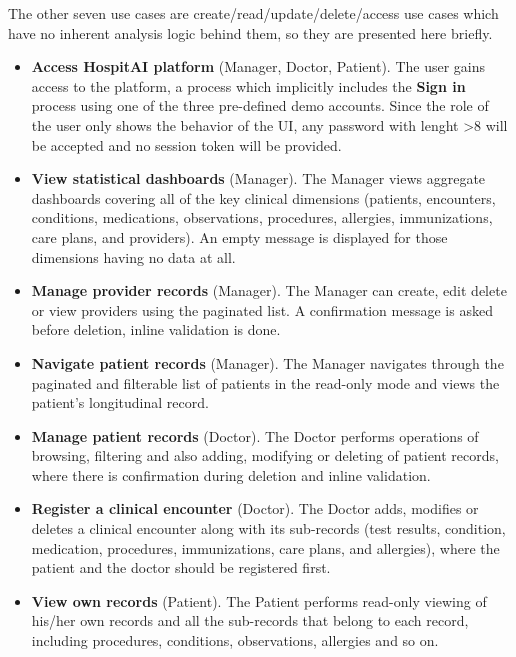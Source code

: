 \vspace{1cm}

The other seven use cases are create/read/update/delete/access use cases which have no inherent analysis logic behind them, so they are presented here briefly.

\begin{itemize}
    \item \textbf{Access HospitAI platform} (Manager, Doctor, Patient). The user gains access to the platform, a process which implicitly includes the \textbf{Sign in} process using one of the three pre-defined demo accounts. Since the role of the user only shows the behavior of the UI, any password with lenght >8 will be accepted and no session token will be provided.
    \item \textbf{View statistical dashboards} (Manager). The Manager views aggregate dashboards covering all of the key clinical dimensions (patients, encounters, conditions, medications, observations, procedures, allergies, immunizations, care plans, and providers). An empty message is displayed for those dimensions having no data at all.
    \item \textbf{Manage provider records} (Manager). The Manager can create, edit delete or view providers using the paginated list. A confirmation message is asked before deletion, inline validation is done.
    \item \textbf{Navigate patient records} (Manager). The Manager navigates through the paginated and filterable list of patients in the read-only mode and views the patient’s longitudinal record.
   \item \textbf{Manage patient records} (Doctor). The Doctor performs operations of browsing, filtering and also adding, modifying or deleting of patient records, where there is confirmation during deletion and inline validation.
     \item \textbf{Register a clinical encounter} (Doctor). The Doctor adds, modifies or deletes a clinical encounter along with its sub-records (test results, condition, medication, procedures, immunizations, care plans, and allergies), where the patient and the doctor should be registered first.
     \item \textbf{View own records} (Patient). The Patient performs read-only viewing of his/her own records and all the sub-records that belong to each record, including procedures, conditions, observations, allergies and so on.
\end{itemize}

